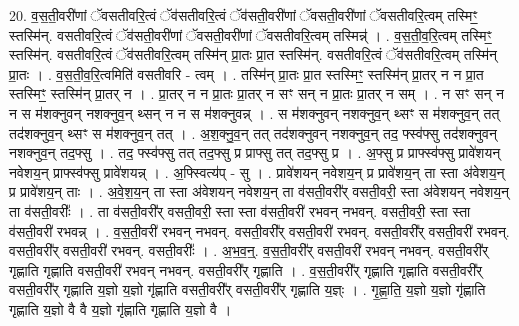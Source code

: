 \documentclass[17pt]{extarticle}
\begin{document}
20. व॒स॒ती॒वरी॑णां ॅवसतीवरि॒त्वं ॅव॑सतीवरि॒त्वं ॅव॑सती॒वरी॑णां ॅवसती॒वरी॑णां ॅवसतीवरि॒त्वम् तस्मिꣳ॒॒ स्तस्मि॑न्. वसतीवरि॒त्वं ॅव॑सती॒वरी॑णां ॅवसती॒वरी॑णां ॅवसतीवरि॒त्वम् तस्मिन्न्॑ । . व॒स॒ती॒व॒रि॒त्वम् तस्मिꣳ॒॒ स्तस्मि॑न्. वसतीवरि॒त्वं ॅव॑सतीवरि॒त्वम् तस्मि॑न् प्रा॒तः प्रा॒त स्तस्मि॑न्. वसतीवरि॒त्वं ॅव॑सतीवरि॒त्वम् तस्मि॑न् प्रा॒तः । . व॒स॒ती॒व॒रि॒त्वमिति॑ वसतीवरि - त्वम् । . तस्मि॑न् प्रा॒तः प्रा॒त स्तस्मिꣳ॒॒ स्तस्मि॑न् प्रा॒तर् न न प्रा॒त स्तस्मिꣳ॒॒ स्तस्मि॑न् प्रा॒तर् न । . प्रा॒तर् न न प्रा॒तः प्रा॒तर् न सꣳ सन् न प्रा॒तः प्रा॒तर् न सम् । . न सꣳ सन् न न स म॑शक्नुवन् नशक्नुव॒न् थ्सन् न न स म॑शक्नुवन्न् । . स म॑शक्नुवन् नशक्नुव॒न् थ्सꣳ स म॑शक्नुव॒न् तत् तद॑शक्नुव॒न् थ्सꣳ स म॑शक्नुव॒न् तत् । . अ॒श॒क्नु॒व॒न् तत् तद॑शक्नुवन् नशक्नुव॒न् तद॒ फ्स्व॑फ्सु तद॑शक्नुवन् नशक्नुव॒न् तद॒फ्सु । . तद॒ फ्स्व॑फ्सु तत् तद॒फ्सु प्र प्राफ्सु तत् तद॒फ्सु प्र । . अ॒फ्सु प्र प्राफ्स्व॑फ्सु प्रावे॑शयन् नवेशय॒न् प्राफ्स्व॑फ्सु प्रावे॑शयन्न् । . अ॒फ्स्वित्य॑प् - सु । . प्रावे॑शयन् नवेशय॒न् प्र प्रावे॑शय॒न् ता स्ता अ॑वेशय॒न् प्र प्रावे॑शय॒न् ताः । . अ॒वे॒श॒य॒न् ता स्ता अ॑वेशयन् नवेशय॒न् ता व॑सती॒वरी᳚र् वसती॒वरी॒ स्ता अ॑वेशयन् नवेशय॒न् ता व॑सती॒वरीः᳚ । . ता व॑सती॒वरी᳚र् वसती॒वरी॒ स्ता स्ता व॑सती॒वरी॑ रभवन् नभवन्. वसती॒वरी॒ स्ता स्ता व॑सती॒वरी॑ रभवन्न् । . व॒स॒ती॒वरी॑ रभवन् नभवन्. वसती॒वरी᳚र् वसती॒वरी॑ रभवन्. वसती॒वरी᳚र् वसती॒वरी॑ रभवन्. वसती॒वरी᳚र् वसती॒वरी॑ रभवन्. वसती॒वरीः᳚ । . अ॒भ॒व॒न्॒. व॒स॒ती॒वरी᳚र् वसती॒वरी॑ रभवन् नभवन्. वसती॒वरी᳚र् गृह्णाति गृह्णाति वसती॒वरी॑ रभवन् नभवन्. वसती॒वरी᳚र् गृह्णाति । . व॒स॒ती॒वरी᳚र् गृह्णाति गृह्णाति वसती॒वरी᳚र् वसती॒वरी᳚र् गृह्णाति य॒ज्ञो य॒ज्ञो गृ॑ह्णाति वसती॒वरी᳚र् वसती॒वरी᳚र् गृह्णाति य॒ज्ञ्ः । . गृ॒ह्णा॒ति॒ य॒ज्ञो य॒ज्ञो गृ॑ह्णाति गृह्णाति य॒ज्ञो वै वै य॒ज्ञो गृ॑ह्णाति गृह्णाति य॒ज्ञो वै । \newline
\end{document}
